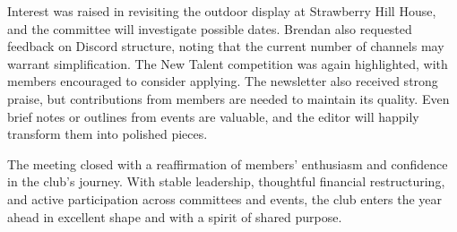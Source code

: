 \medskip
{}
\noindent
Interest was raised in revisiting the outdoor display at Strawberry Hill House, and the committee will investigate possible dates. Brendan also requested feedback on Discord structure, noting that the current number of channels may warrant simplification.
%
The New Talent competition was again highlighted, with members encouraged to consider applying. The newsletter also received strong praise, but contributions from members are needed to maintain its quality. Even brief notes or outlines from events are valuable, and the editor will happily transform them into polished pieces.

\medskip
{}
\noindent
The meeting closed with a reaffirmation of members’ enthusiasm and confidence in the club’s journey. With stable leadership, thoughtful financial restructuring, and active participation across committees and events, the club enters the year ahead in excellent shape and with a spirit of shared purpose.

\closearticle
